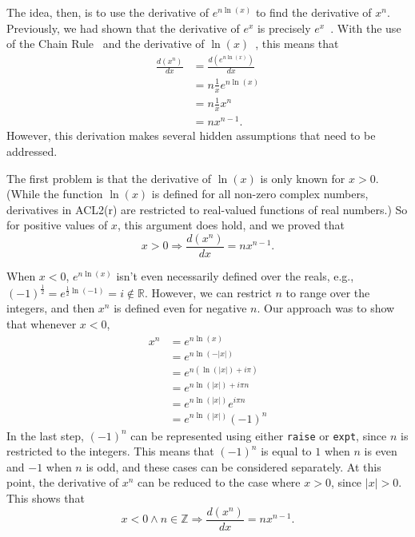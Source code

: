 \documentclass[copyright,creativecommons]{eptcs}
\begin{document}
The idea, then, is to use the derivative of $e^{n \ln(x)}$ to find
the derivative of $x^n$. Previously, we had shown that the derivative
of $e^x$ is precisely $e^x$~\cite{ReGa:automatic-differentiator}. With
the use of the Chain Rule~\cite{GaCo:chain-rule} and the derivative of
$\ln(x)$~\cite{ReGa:automatic-differentiator}, this means that
\begin{align}
\frac{d(x^n)}{dx} &= \frac{d(e^{n\ln(x)})}{dx} \\
                          &= n \frac{1}{x} e^{n\ln(x)} \\
                                     &= n \frac{1}{x} x^n \\
                                     &= n x^{n-1}.
\end{align}
However, this derivation makes several hidden assumptions that need to
be addressed.

The first problem is that the derivative of $\ln(x)$ is only known for
$x>0$.  (While the function $\ln(x)$ is defined for all non-zero
complex numbers, derivatives in ACL2(r) are restricted to real-valued
functions of real numbers.) So for positive values of $x$, this
argument does hold, and we proved that
\begin{equation}
x>0 \Rightarrow \frac{d(x^n)}{dx} = n x^{n-1}.
\end{equation}

When $x<0$, $e^{n\ln(x)}$ isn't even necessarily defined over the
reals, e.g., $(-1)^{\frac{1}{2}} = e^{\frac{1}{2} \ln(-1)} = i \not\in
\mathbb{R}$. However, we can restrict $n$ to range over the integers,
and then $x^n$ is defined even for negative $n$. Our approach was to
show that whenever $x<0$, 
\begin{align}
x^n &= e^{n \ln(x)} \\
       &= e^{n \ln(-|x|)} \\
       &= e^{n (\ln(|x|) + i \pi)} \\
       &= e^{n \ln(|x|) + i \pi n} \\
       &= e^{n \ln(|x|)} e^{i \pi n} \\
       &= e^{n \ln(|x|)} (-1)^n
\end{align}
In the last step, $(-1)^n$ can be represented using either
\texttt{raise} or \texttt{expt}, since $n$ is restricted to the
integers. This means that $(-1)^n$ is equal to $1$ when $n$ is even
and $-1$ when $n$ is odd, and these cases can be considered
separately. At this point, the derivative of $x^n$ can be reduced to
the case where $x>0$, since $|x|>0$. This shows that 
\begin{equation}
x<0 \wedge n \in \mathbb{Z} \Rightarrow \frac{d(x^n)}{dx} = n x^{n-1}.
\end{equation}
\end{document}

